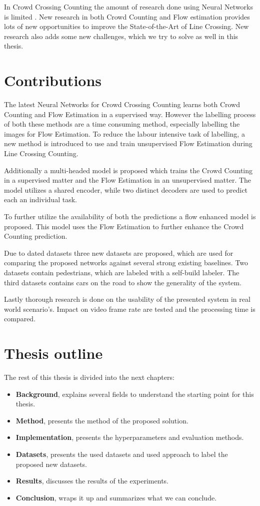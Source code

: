 In Crowd Crossing Counting the amount of research done using Neural Networks is limited \cite{leibe_crossing-line_2016, cao_large_2015}. New research in both Crowd Counting and Flow estimation provides lots of new opportunities to improve the State-of-the-Art of Line Crossing. New research also adds some new challenges, which we try to solve as well in this thesis.

\section{Contributions}
The latest Neural Networks for Crowd Crossing Counting \cite{leibe_crossing-line_2016} learns both Crowd Counting and Flow Estimation in a supervised way. However the labelling process of both these methods are a time consuming method, especially labelling the images for Flow Estimation. To reduce the labour intensive task of labelling, a new method is introduced to use and train unsupervised Flow Estimation during Line Crossing Counting.

Additionally a multi-headed model is proposed which trains the Crowd Counting in a supervised matter and the Flow Estimation in an unsupervised matter. The model utilizes a shared encoder, while two distinct decoders are used to predict each an individual task.

To further utilize the availability of both the predictions a flow enhanced model is proposed. This model uses the Flow Estimation to further enhance the Crowd Counting prediction.

Due to dated datasets three new datasets are proposed, which are used for comparing the proposed networks against several strong existing baselines. Two  datasets contain pedestrians, which are labeled with a self-build labeler. The third datasets contains cars on the road to show the generality of the system.

Lastly thorough research is done on the usability of the presented system in real world scenario's. Impact on video frame rate are tested and the processing time is compared.


\section{Thesis outline}
The rest of this thesis is divided into the next chapters:

 \begin{itemize}
 	\item \textbf{Background}, explains several fields to understand the starting point for this thesis.
    \item \textbf{Method}, presents the method of the proposed solution.
    \item \textbf{Implementation}, presents the hyperparameters and evaluation methods.
    \item \textbf{Datasets}, presents the used datasets and used approach to label the proposed new datasets.
    \item \textbf{Results}, discusses the results of the experiments.
    \item \textbf{Conclusion}, wraps it up and summarizes what we can conclude.
 \end{itemize}
